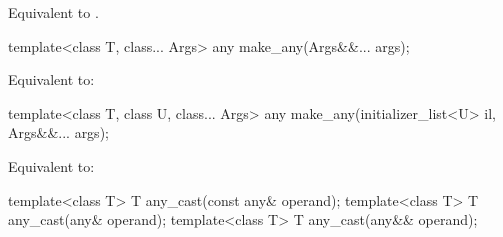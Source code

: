 \begin{itemdescr}
\pnum
\effects
Equivalent to .
\end{itemdescr}

%
\begin{itemdecl}
template<class T, class... Args>
  any make_any(Args&&... args);
\end{itemdecl}

\begin{itemdescr}
\pnum
\effects
Equivalent to: 
\end{itemdescr}

%
\begin{itemdecl}
template<class T, class U, class... Args>
  any make_any(initializer_list<U> il, Args&&... args);
\end{itemdecl}

\begin{itemdescr}
\pnum
\effects
Equivalent to: 
\end{itemdescr}

%
\begin{itemdecl}
template<class T>
  T any_cast(const any& operand);
template<class T>
  T any_cast(any& operand);
template<class T>
  T any_cast(any&& operand);
\end{itemdecl}

